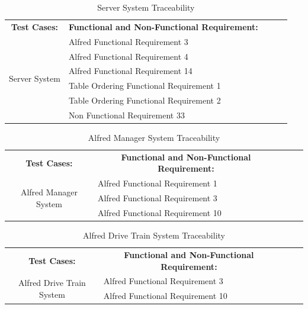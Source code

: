 \documentclass [10pt]{article}
\begin{document}
\begin{table}[h!]
\centering
\begin{tabular}{lllll}
\cline{1-2}
\multicolumn{1}{|c|}{\textbf{Test Cases:}} & \multicolumn{1}{c|}{\textbf{Functional and Non-Functional Requirement:}} &  &  &  \\ \cline{1-2}
\multicolumn{1}{|c|}{\multirow{6}{*}{Server System}} & \multicolumn{1}{l|}{Alfred Functional Requirement 3} &  &  &  \\ \cline{2-2}
\multicolumn{1}{|c|}{} & \multicolumn{1}{l|}{Alfred Functional Requirement 4} &  &  &  \\ \cline{2-2}
\multicolumn{1}{|c|}{} & \multicolumn{1}{l|}{Alfred Functional Requirement 14} &  &  &  \\ \cline{2-2}
\multicolumn{1}{|c|}{} & \multicolumn{1}{l|}{Table Ordering Functional Requirement 1} &  &  &  \\ \cline{2-2}
\multicolumn{1}{|c|}{} & \multicolumn{1}{l|}{Table Ordering Functional Requirement 2} &  &  &  \\ \cline{2-2}
\multicolumn{1}{|c|}{} & \multicolumn{1}{l|}{Non Functional Requirement 33} &  &  &  \\ \cline{1-2}
\end{tabular}
\caption{Server System Traceability}
\end{table}


\begin{table}[h!]
\centering
\begin{tabular}{lllll}
\cline{1-2}
\multicolumn{1}{|c|}{\textbf{Test Cases:}} & \multicolumn{1}{c|}{\textbf{Functional and Non-Functional Requirement:}} &  &  &  \\ \cline{1-2}
\multicolumn{1}{|c|}{\multirow{3}{*}{Alfred Manager System}} & \multicolumn{1}{l|}{Alfred Functional Requirement 1} &  &  &  \\ \cline{2-2}
\multicolumn{1}{|c|}{} & \multicolumn{1}{l|}{Alfred Functional Requirement 3} &  &  &  \\ \cline{2-2}
\multicolumn{1}{|c|}{} & \multicolumn{1}{l|}{Alfred Functional Requirement 10} &  &  &  \\ \cline{1-2}
\end{tabular}
\caption{Alfred Manager System Traceability}
\end{table}

\begin{table}[h!]
\centering
\begin{tabular}{lllll}
\cline{1-2}
\multicolumn{1}{|c|}{\textbf{Test Cases:}} & \multicolumn{1}{c|}{\textbf{Functional and Non-Functional Requirement:}} &  &  &  \\ \cline{1-2}
\multicolumn{1}{|c|}{\multirow{2}{*}{Alfred Drive Train System}} & \multicolumn{1}{l|}{Alfred Functional Requirement 3} &  &  &  \\ \cline{2-2}
\multicolumn{1}{|c|}{} & \multicolumn{1}{l|}{Alfred Functional Requirement 10} &  &  &  \\ \cline{1-2}
\end{tabular}
\caption{Alfred Drive Train System Traceability}
\end{table}
\end{document}
